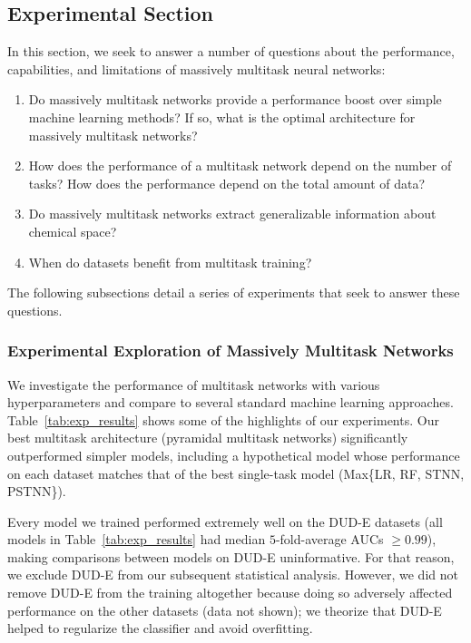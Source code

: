 \subsection{Experimental Section}

In this section, we seek to answer a number of questions about the
performance, capabilities, and limitations of massively multitask neural
networks:

\begin{enumerate}
\itemsep0em
\item Do massively multitask networks provide a performance boost over
  simple machine learning methods? If so, what is the optimal architecture
  for massively multitask networks?
\item How does the performance of a multitask network depend on the number
  of tasks? How does the performance depend on the total amount of data?
\item Do massively multitask networks extract generalizable information
  about chemical space?
\item When do datasets benefit from multitask training?
\end{enumerate}

The following subsections detail a series of experiments that seek to
answer these questions.

\subsubsection{Experimental Exploration of Massively Multitask Networks}
\label{sec:experimental}
We investigate the performance of multitask networks with various
hyperparameters and compare to several standard machine learning
approaches. Table~\ref{tab:exp_results} shows some of the highlights of our
experiments. Our best multitask architecture (pyramidal multitask networks)
significantly outperformed simpler models, including a hypothetical model
whose performance on each dataset matches that of the best single-task
model (Max\{LR, RF, STNN, PSTNN\}).

Every model we trained performed extremely well on the DUD-E datasets (all
models in Table~\ref{tab:exp_results} had median $5$-fold-average AUCs
$\ge0.99$), making comparisons between models on DUD-E uninformative. For
that reason, we exclude DUD-E from our subsequent statistical analysis.
However, we did not remove DUD-E from the training altogether because doing
so adversely affected performance on the other datasets (data not shown);
we theorize that DUD-E helped to regularize the classifier and avoid
overfitting.

